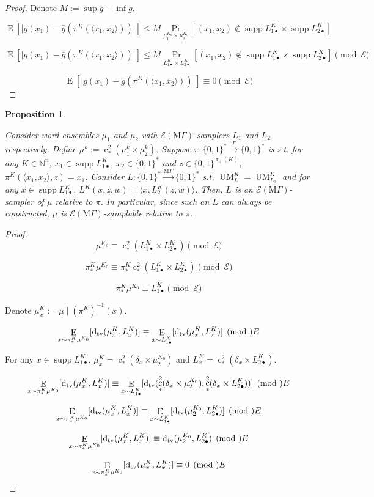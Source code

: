 \documentclass{article}
\numberwithin{equation}{section}
\theoremstyle{definition}
\theoremstyle{plain}
\newtheorem{proposition}{Proposition}[section]
\newcommand{\Bool}{\{0,1\}}
\newcommand{\Words}{{\Bool^*}}
\DeclareMathOperator{\Supp}{supp}
\DeclareMathOperator{\Prb}{Pr}
\DeclareMathOperator{\E}{E}
\DeclareMathOperator{\R}{r}
\DeclareMathOperator{\UM}{UM}
\DeclareMathOperator{\En}{c}
\newcommand{\Dtv}{\operatorname{d}_{\textnormal{tv}}}
\newcommand{\Nats}{\mathbb{N}}
\newcommand{\Abs}[1]{\lvert #1 \rvert}
\newcommand{\Chev}[1]{\langle #1 \rangle}
\newcommand{\MGrow}{\mathrm{M}\Gamma}
\newcommand{\Fall}{\mathcal{E}}
\newcommand{\EMG}{\Fall(\MGrow)}
\newcommand{\Scheme}{\xrightarrow{\Gamma}}
\newcommand{\MScheme}{\xrightarrow{\MGrow}}
\begin{document}
\begin{proof}

Denote $M:= \sup g - \inf g$.

$$\E[\Abs{g(x_1)-\bar{g}(\pi^{K}(\Chev{x_1,x_2}))}] \leq M \Prb_{ \mu_1^{K_0} \times \mu_2^{K_0}}[(x_1,x_2) \not\in \Supp L_{1\bullet}^{K} \times \Supp L_{2\bullet}^{K}]$$

$$\E[\Abs{g(x_1)-\bar{g}(\pi^{K}(\Chev{x_1,x_2}))}] \leq M\Prb_{ L_{1\bullet}^{K} \times L_{2\bullet}^{K}}[(x_1,x_2) \not\in \Supp L_{1\bullet}^{K} \times \Supp L_{2\bullet}^{K}] \pmod \Fall$$

$$\E[\Abs{g(x_1)-\bar{g}(\pi^{K}(\Chev{x_1,x_2}))}] \equiv 0 \pmod \Fall$$
\end{proof}
\begin{samepage}
\begin{proposition}
\label{prp:smp_base_change}

Consider word ensembles $\mu_1$ and $\mu_2$ with $\EMG$-samplers $L_1$ and $L_2$ respectively. Define ${\mu^k:=\En_*^2(\mu_1^k \times \mu_2^k)}$. Suppose ${\pi: \Words \Scheme \Words}$ is s.t. for any $K \in \Nats^n$, ${x_1 \in \Supp L_{1\bullet}^{K}}$, ${x_2 \in \Words}$ and $z \in \Bool^{\R_\pi(K)}$, ${\pi^{K}(\Chev{x_1,x_2},z)=x_1}$. Consider ${L: \Words \MScheme \Words}$ s.t. $\UM_L^{K}=\UM_{L_2}^{K}$ and for any $x \in \Supp L_{1\bullet}^{K}$, ${L^{K}(x,z,w)=\Chev{x,L_2^{K}(z,w)}}$. Then, $L$ is an $\EMG$-sampler of $\mu$ relative to $\pi$. In particular, since such an $L$ can always be constructed, $\mu$ is $\EMG$-samplable relative to $\pi$.

\end{proposition}
\end{samepage}

\begin{proof}

\[\mu^{K_0} \equiv \En_*^2(L_{1\bullet}^K \times L_{2\bullet}^K)\pmod \Fall\]

\[\pi_*^K\mu^{K_0} \equiv \pi_*^K\En_*^2(L_{1\bullet}^K \times L_{2\bullet}^K) \pmod \Fall\] 

\[\pi_*^K\mu^{K_0} \equiv  L_{1\bullet}^K \pmod \Fall\]

Denote $\mu_x^K:=\mu \mid (\pi^K)^{-1}(x)$.

\[\E_{x \sim \pi_*^K\mu^{K_0}}[\Dtv(\mu_x^K,L_x^K)] \equiv \E_{x \sim L_{1\bullet}^K}[\Dtv(\mu_x^K,L_x^K)] \pmod \Fall\]

For any $x \in \Supp L_{1\bullet}^{K}$, $\mu_x^K = \En_*^2(\delta_x \times \mu_2^{K_0})$ and $L_x^K=\En_*^2(\delta_x \times L_{2\bullet}^K)$.

\[\E_{x \sim \pi_*^K\mu^{K_0}}[\Dtv(\mu_x^K,L_x^K)] \equiv \E_{x \sim L_{1\bullet}^K}[\Dtv(\En_*^2(\delta_x \times \mu_2^{K_0}),\En_*^2(\delta_x \times L_{2\bullet}^K))] \pmod \Fall\]

\[\E_{x \sim \pi_*^K\mu^{K_0}}[\Dtv(\mu_x^K,L_x^K)] \equiv \E_{x \sim L_{1\bullet}^K}[\Dtv(\mu_2^{K_0},L_{2\bullet}^K)] \pmod \Fall\]

\[\E_{x \sim \pi_*^K\mu^{K_0}}[\Dtv(\mu_x^K,L_x^K)] \equiv \Dtv(\mu_2^{K_0},L_{2\bullet}^K) \pmod \Fall\]

\[\E_{x \sim \pi_*^K\mu^{K_0}}[\Dtv(\mu_x^K,L_x^K)] \equiv 0 \pmod \Fall\]
\end{proof}
\end{document}
